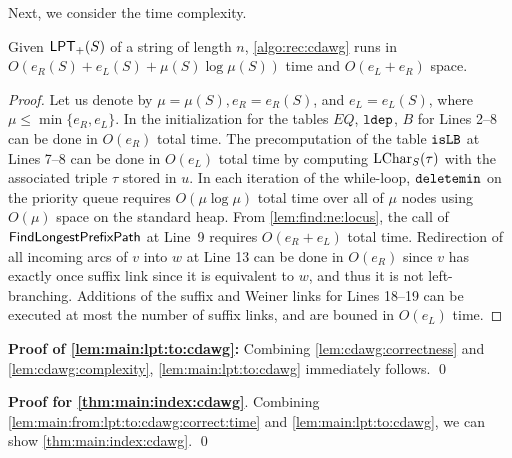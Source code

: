 \documentclass{article}
\begin{document}
Next, we consider the time complexity. 

\begin{lemmarep}\label{lem:cdawg:complexity}
  Given $\mathsf{LPT}_{+}(S)$ of a string of length $n$, 
  \cref{algo:rec:cdawg} runs in $O(e_R(S) + e_L(S) + \mu(S)\log \mu(S))$ time and $O(e_L + e_R)$ space. 
\end{lemmarep}

\begin{proof}
Let us denote by $\mu = \mu(S), e_R = e_R(S)$, and $e_L = e_L(S)$, where $\mu \le \min\{e_R, e_L\}$.
In the initialization for the tables $EQ$, $\mathtt{ldep}$, $B$ for Lines 2--8 can be done in $O(e_R)$ total time. The precomputation of the table $\mathtt{isLB}$ at Lines 7--8 can be done in $O(e_L)$ total time by computing $\mathrm{LChar}_{S}(\tau)$ with the associated triple $\tau$ stored in $u$. 
In each iteration of the while-loop, $\mathtt{deletemin}$ on the priority queue requires $O(\mu \log \mu)$ total time over all of $\mu$ nodes using $O(\mu)$ space on the standard heap.
From \cref{lem:find:ne:locus}, the call of $\textsf{FindLongestPrefixPath}$ at Line~9 requires $O(e_R + e_L)$ total time. Redirection of all incoming arcs of $v$ into $w$ at Line 13 can be done in $O(e_R)$ since $v$ has exactly once suffix link since it is equivalent to $w$, and thus it is not left-branching.
Additions of the suffix and Weiner links for Lines 18--19 can be executed at most the number of suffix links, and are bouned in $O(e_L)$ time.
\end{proof}

\begin{trivlist}\item[]
  \textbf{Proof of \cref{lem:main:lpt:to:cdawg}:}
  Combining \cref{lem:cdawg:correctness} and \cref{lem:cdawg:complexity}, \cref{lem:main:lpt:to:cdawg} immediately follows.
\qed   
\end{trivlist}

\begin{trivlist}\item[]
  \textbf{Proof for \cref{thm:main:index:cdawg}}.
  Combining 
  \cref{lem:main:from:lpt:to:cdawg:correct:time}
  and
  \cref{lem:main:lpt:to:cdawg}, we can show \cref{thm:main:index:cdawg}. 
\qed
\end{trivlist}



\end{document}
